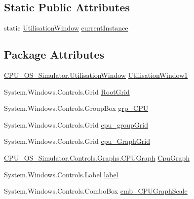 \subsection*{Static Public Attributes}
\begin{DoxyCompactItemize}
\item 
static \hyperlink{class_c_p_u___o_s___simulator_1_1_utilisation_window}{Utilisation\+Window} \hyperlink{class_c_p_u___o_s___simulator_1_1_utilisation_window_a4f5f9f6ec438e3c166d4c7a3fa29e131}{current\+Instance}
\end{DoxyCompactItemize}
\subsection*{Package Attributes}
\begin{DoxyCompactItemize}
\item 
\hyperlink{class_c_p_u___o_s___simulator_1_1_utilisation_window}{C\+P\+U\+\_\+\+O\+S\+\_\+\+Simulator.\+Utilisation\+Window} \hyperlink{class_c_p_u___o_s___simulator_1_1_utilisation_window_a702f7f3600001706fb93aa48fd2049c1}{Utilisation\+Window1}
\item 
System.\+Windows.\+Controls.\+Grid \hyperlink{class_c_p_u___o_s___simulator_1_1_utilisation_window_a5017c2a587717b1d39bbefb3128f0005}{Root\+Grid}
\item 
System.\+Windows.\+Controls.\+Group\+Box \hyperlink{class_c_p_u___o_s___simulator_1_1_utilisation_window_a05acd35d0b339101c49d313480d4708a}{grp\+\_\+\+C\+P\+U}
\item 
System.\+Windows.\+Controls.\+Grid \hyperlink{class_c_p_u___o_s___simulator_1_1_utilisation_window_a46aa403e5d65d2a7fb4d2f242ab34d57}{cpu\+\_\+group\+Grid}
\item 
System.\+Windows.\+Controls.\+Grid \hyperlink{class_c_p_u___o_s___simulator_1_1_utilisation_window_a89970f438dcb79f852cd63ee558c9388}{cpu\+\_\+\+Graph\+Grid}
\item 
\hyperlink{class_c_p_u___o_s___simulator_1_1_controls_1_1_graphs_1_1_c_p_u_graph}{C\+P\+U\+\_\+\+O\+S\+\_\+\+Simulator.\+Controls.\+Graphs.\+C\+P\+U\+Graph} \hyperlink{class_c_p_u___o_s___simulator_1_1_utilisation_window_a06d7108831a173a5342a06d491a15ce0}{Cpu\+Graph}
\item 
System.\+Windows.\+Controls.\+Label \hyperlink{class_c_p_u___o_s___simulator_1_1_utilisation_window_aa45faea5a6347cb26639a4e279117ecf}{label}
\item 
System.\+Windows.\+Controls.\+Combo\+Box \hyperlink{class_c_p_u___o_s___simulator_1_1_utilisation_window_af45ffcdbf17ecf13e3b63a23352fc842}{cmb\+\_\+\+C\+P\+U\+Graph\+Scale}

\end{DoxyCompactItemize}
